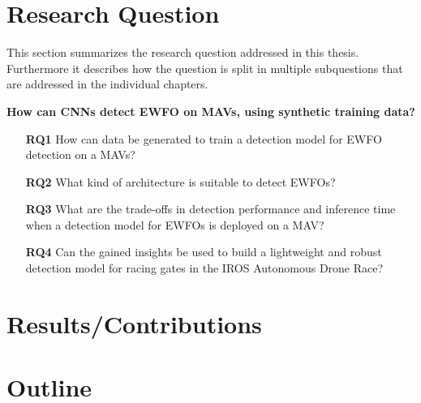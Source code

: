 \section{Research Question}

This section summarizes the research question addressed in this thesis. Furthermore it describes how the question is split in multiple subquestions that are addressed in the individual chapters.

	\textbf{How can \acp{CNN} detect \ac{EWFO} on \acp{MAV}, using synthetic training data?}


\begin{enumerate}
	\item[\textbf{RQ1}]How can data be generated to train a detection model for \ac{EWFO} detection on a \acp{MAV}?
	\item[\textbf{RQ2}]What kind of architecture is suitable to detect \acp{EWFO}?
	\item[\textbf{RQ3}]What are the trade-offs in detection performance and inference time when a detection model for \acp{EWFO} is deployed on a \ac{MAV}?
	\item[\textbf{RQ4}]Can the gained insights be used to build a lightweight and robust detection model for racing gates in the \ac{IROS} Autonomous Drone Race?
\end{enumerate}

\section{Results/Contributions}


\section{Outline}

